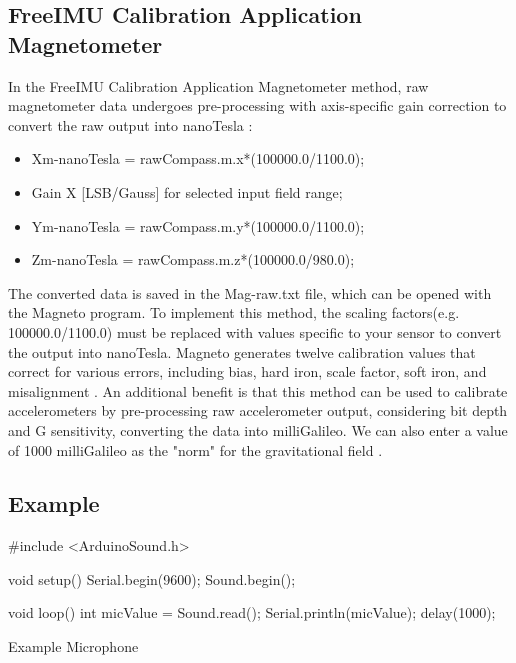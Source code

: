 \subsection{FreeIMU Calibration Application Magnetometer}

In the FreeIMU Calibration Application Magnetometer method, raw magnetometer data undergoes pre-processing with axis-specific gain correction to convert the raw output into nanoTesla \cite{Rehder:2017}:

\begin{itemize}
  \item Xm-nanoTesla = rawCompass.m.x*(100000.0/1100.0); 
  \item Gain X [LSB/Gauss] for selected input field range;
  \item Ym-nanoTesla = rawCompass.m.y*(100000.0/1100.0);  
  \item  Zm-nanoTesla = rawCompass.m.z*(100000.0/980.0);
\end{itemize}

The converted data is saved in the Mag-raw.txt file, which can be opened with the Magneto program. To implement this method, the scaling factors(e.g. 100000.0/1100.0) must be replaced with values specific to your sensor to convert the output into nanoTesla. Magneto generates twelve calibration values that correct for various errors, including bias, hard iron, scale factor, soft iron, and misalignment \cite{Rehder:2017}. An additional benefit is that this method can be used to calibrate accelerometers by pre-processing raw accelerometer output, considering bit depth and G sensitivity, converting the data into milliGalileo. We can also enter a value of 1000 milliGalileo as the "norm" for the gravitational field \cite{Rehder:2017}.



\subsection{Example}

\begin{code}
    \begin{Arduino}
#include <ArduinoSound.h>
    
void setup() {
    Serial.begin(9600);
    Sound.begin();
}
    
void loop() {
    int micValue = Sound.read();
    Serial.println(micValue);
    delay(1000);
}
\end{Arduino}
\caption{Example Microphone}

\end{code}

